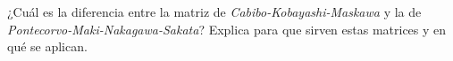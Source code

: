 \documentclass[./../main.tex]{subfiles}
\begin{document}
	\begin{exercise}
		¿Cuál es la diferencia entre la matriz de \textit{Cabibo-Kobayashi-Maskawa} y la de \textit{Pontecorvo-Maki-Nakagawa-Sakata}? Explica para que sirven estas matrices y en qué se aplican.
	\end{exercise}
\end{document}
